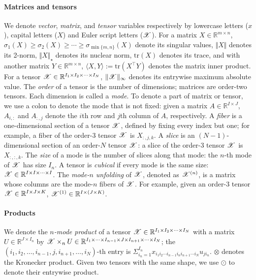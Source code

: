 \documentclass{article}
\newcommand{\T}[2][]{#1\mathscr{\MakeUppercase{#2}}}
\newcommand{\RR}{\mathbb{R}}
\newcommand{\norm}[1]{\Vert #1 \Vert}
\newcommand{\nucnorm}[1]{\norm{#1}_\star}
\newcommand{\maxnorm}[1]{\norm{#1}_{\infty}}
\theoremstyle{plain}
\begin{document}
\paragraph{Matrices and tensors}
We denote \textit{vector}, \textit{matrix}, and \textit{tensor} variables
respectively by lowercase letters ($x$), capital letters ($X$) and Euler script letters ($\T{X}$).
For a matrix $X \in \RR^{m \times n}$, $\sigma_1 (X) \geq \sigma_2 (X) \geq \cdots \geq \sigma_{\min \{m, n\}} (X)$ denote its singular values, $\norm{X}$ denotes its 2-norm, $\nucnorm{X}$ denotes its nuclear norm, $\mathrm{tr}(X)$ denotes its trace, and with another matrix $Y \in \RR^{m \times n}$, $\langle X, Y \rangle := \mathrm{tr}(X^\top Y)$ denotes the matrix inner product.
For a tensor $\T{X} \in \mathbb{R}^{I_1 \times I_2 \times \cdots \times I_N}$, $\maxnorm{\T{X}}$ denotes its entrywise maximum absolute value.
The \emph{order} of a tensor is the number of dimensions; matrices are order-two tensors.
Each dimension is called a \emph{mode}.
To denote a part of matrix or tensor, we use a colon to denote the mode that is not fixed:
given a matrix $A \in \mathbb{R}^{I \times J}$, $A_{i, :}$ and $A_{:, j}$ denote the $i$th row and $j$th column of $A$, respectively.
A \emph{fiber} is a one-dimensional section of a tensor $\T{X}$, defined by fixing every index but one; for example, a fiber of the order-3 tensor $\T{X}$ is $X_{:, j, k}$.
A \emph{slice} is an $(N-1)$-dimensional section of an order-$N$ tensor $\T{X}$: a slice of the order-3 tensor $\T{X}$ is $X_{:, :, k}$.
The \emph{size} of a mode is the number of slices along that mode: the $n$-th mode of $\T{X}$ has size $I_n$. 
A tensor is \emph{cubical} if every mode is the same size: $\T{X} \in \RR^{I \times I \times \cdots \times I}$.
The \emph{mode-$n$ unfolding} of $\T{X}$, denoted as $\T{X}^{(n)}$, is a matrix whose columns are the mode-$n$ fibers of $\T{X}$.
For example, given an order-3 tensor $\T{X} \in \mathbb{R}^{I \times J \times K}$, $\T{X}^{(1)} \in \mathbb{R}^{I \times (J \times K)}$.

\paragraph{Products}
We denote the \emph{$n$-mode product} of a tensor $\T{X} \in \mathbb{R}^{I_1 \times I_2 \times \cdots \times I_N}$ with a matrix $U \in \mathbb{R}^{J \times I_n}$ by $\T{X} \times_n U \in \mathbb{R}^{I_1 \times \cdots \times I_{n-1} \times J \times I_{n+1} \times \cdots \times I_N}$; the $(i_1, i_2, \dots, i_{n-1}, j, i_{n+1}, \dots, i_N)$-th entry is $\Sigma_{i_n = 1}^{I_n} x_{i_1 i_2 \cdots i_{n-1} i_n i_{n+1} \cdots i_N} u_{j i_n}$.
$\otimes$ denotes the Kronecker product. 
Given two tensors with the same shape, we use $\odot$ to denote their entrywise product.
\end{document}
